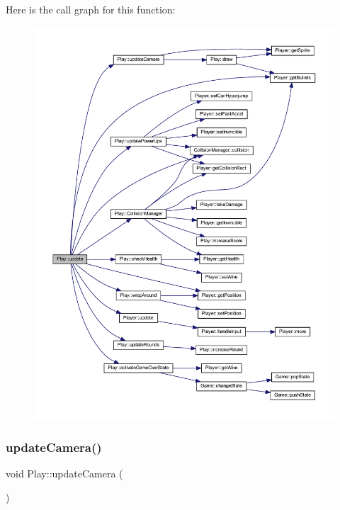 Here is the call graph for this function\+:
\nopagebreak
\begin{figure}[H]
\begin{center}
\leavevmode
\includegraphics[width=350pt]{class_play_a8eaa457d009e35bfbf699b38b569e3b8_cgraph}
\end{center}
\end{figure}
\mbox{\label{class_play_a321efb6f8d02dc3695404b33c22e9285}} 
\subsubsection{\texorpdfstring{update\+Camera()}{updateCamera()}}
{\footnotesize\ttfamily void Play\+::update\+Camera (\begin{DoxyParamCaption}{ }\end{DoxyParamCaption})}

